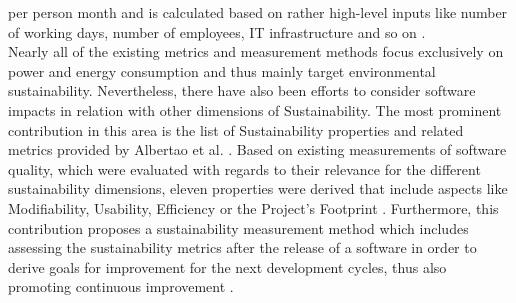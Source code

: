 \documentclass[oribibl]{llncs}
\begin{document}
per person month and is calculated based on rather high-level inputs like number of working days, number of employees, IT infrastructure and so on \cite{kern_impacts_2015}.\\
Nearly all of the existing metrics and measurement methods focus exclusively on power and energy consumption and thus mainly target environmental sustainability. %
Nevertheless, there have also been efforts to consider software impacts in relation with other dimensions of Sustainability. The most prominent contribution in this area is the list of Sustainability properties and related metrics provided by Albertao et al. \cite{albertao_measuring_2010}. Based on existing measurements of software quality, which were evaluated with regards to their relevance for the different sustainability dimensions, eleven properties were derived that include aspects like Modifiability, Usability, Efficiency or the Project's Footprint \cite{albertao_measuring_2010}. Furthermore, this contribution proposes a sustainability measurement method which includes assessing the sustainability metrics after the release of a software in order to derive goals for improvement for the next development cycles, thus also promoting continuous improvement \cite{albertao_measuring_2010}.

\end{document}
